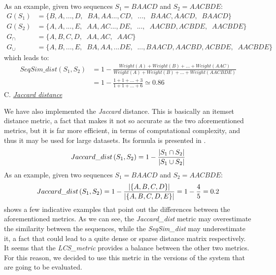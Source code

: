 As an example, given two sequences $S_1 = BAACD$ and $S_2 = AACBDE$:
%
\begin{align*}
  G(S_1) &= \lbrace B,A, ..., D,\;\; BA, AA ..., CD,\;\; ...,\;\; BAAC, AACD,\;\; BAACD\rbrace \\
  G(S_2) &= \lbrace A,A, ..., E,\;\; AA, AC ..., DE,\;\; ...,\;\; AACBD, ACBDE,\;\; AACBDE\rbrace \\
  G_\cap &= \lbrace A,B,C,D,\;\; AA,AC,\;\; AAC\rbrace \\
  G_\cup &= \lbrace A,B,...,E,\;\; BA,AA,...DE,\;\;...,BAACD,AACBD,ACBDE,\;\; AACBDE\rbrace
\end{align*}
%
which leads to:
%
\begin{align*}
  SeqSim\_dist\left( S_1, S_2 \right) &= 
  1 - \frac{ Weight(A) + Weight(B) +... + Weight(AAC)}
       { Weight(A) + Weight(B) +... + Weight(AACBDE) } \\
       &= 1 - \frac{ 1 + 1 +... + 3}
       { 1 + 1 +... + 6 } \simeq 0.86
\end{align*}
%
\vspace{15pt}
\noindent
C. \textit{\underline{Jaccard distance}}
\vspace{-10pt}

We have also implemented the \textit{Jaccard} distance. This is basically an itemset distance metric, a fact that makes it not so accurate as the two aforementioned metrics, but it is far more efficient, in terms of computational complexity, and thus it may be used for large datasets. Its formula is presented in .
%
\vspace{1.5ex}
\begin{equation}
 \label{eq:jaccard}
 \centering
  Jaccard\_dist\left( S_1, S_2 \right) = 
  1 - \frac{ \left| S_1 \cap S_2 \right|}
       {\left| S_1 \cup S_2 \right|}
  \vspace{1.5ex}
\end{equation}
%
As an example, given two sequences $S_1 = BAACD$ and $S_2 = AACBDE$:
%
\vspace{4pt}
\begin{align*}
  Jaccard\_dist\left( S_1, S_2 \right) = 
  1 - \frac{ \left| \lbrace A, B, C, D\rbrace \right|}
       {\left| \lbrace A, B, C, D, E\rbrace \right|} = 1 - \frac{4}{5} = 0.2
  \vspace{15pt}
\end{align*}
%
 shows a few indicative examples that point out the differences between the aforementioned metrics. As we can see, the \textit{Jaccard\_dist} metric may overestimate the similarity between the sequences, while the \textit{SeqSim\_dist} may underestimate it, a fact that could lead to a quite dense or sparse distance matrix respectively. It seems that the \textit{LCS\_metric} provides a balance between the other two metrics. For this reason, we decided to use this metric in the versions of the system that are going to be evaluated.

